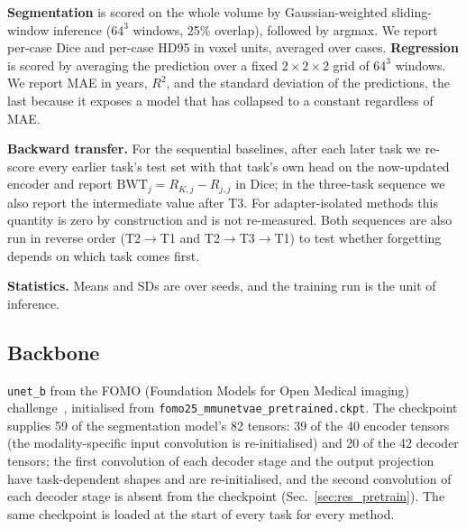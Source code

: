 \iffull\documentclass[journal]{IEEEtran}\else\documentclass[journal,twoside,web]{ieeecolor}\usepackage{generic}\fi
\begin{document}
\textbf{Segmentation} is scored on the whole volume by Gaussian-weighted sliding-window inference ($64^3$ windows, 25\% overlap), followed by argmax. We report per-case Dice and per-case HD95 in voxel units, averaged over cases. \textbf{Regression} is scored by averaging the prediction over a fixed $2{\times}2{\times}2$ grid of $64^3$ windows. We report MAE in years, $R^2$, and the standard deviation of the predictions, the last because it exposes a model that has collapsed to a constant regardless of MAE.

\textbf{Backward transfer.} For the sequential baselines, after each later task we re-score every earlier task's test set with that task's own head on the now-updated encoder and report $\text{BWT}_j = R_{K,j} - R_{j,j}$ in Dice; in the three-task sequence we also report the intermediate value after T3. For adapter-isolated methods this quantity is zero by construction and is not re-measured. Both sequences are also run in reverse order (T2$\to$T1 and T2$\to$T3$\to$T1) to test whether forgetting depends on which task comes first.

\textbf{Statistics.} Means and SDs are over seeds, and the training run is the unit of inference. 

\subsection{Backbone}
\label{sec:backbone}

\texttt{unet\_b} from the FOMO (Foundation Models for Open Medical imaging) challenge~\cite{fomo2025}, initialised from \texttt{fomo25\_mmunetvae\_pretrained.ckpt}. The checkpoint supplies 59 of the segmentation model's 82 tensors: 39 of the 40 encoder tensors (the modality-specific input convolution is re-initialised) and 20 of the 42 decoder tensors; the first convolution of each decoder stage and the output projection have task-dependent shapes and are re-initialised, and the second convolution of each decoder stage is absent from the checkpoint (Sec.~\ref{sec:res_pretrain}). The same checkpoint is loaded at the start of every task for every method.
\end{document}
